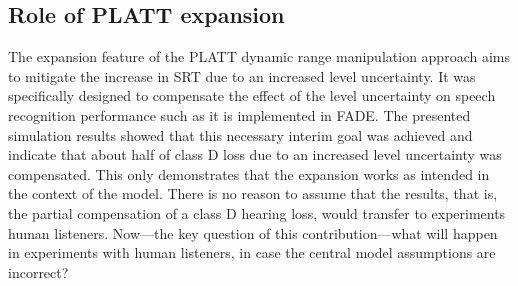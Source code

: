 \documentclass[10pt,a4paper,twocolumn]{article}
\begin{document}
\subsection*{Role of PLATT expansion}
%
The expansion feature of the PLATT dynamic range manipulation approach aims to mitigate the increase in SRT due to an increased level uncertainty.
%
It was specifically designed to compensate the effect of the level uncertainty on speech recognition performance such as it is implemented in FADE.
%
The presented simulation results showed that this necessary interim goal was achieved and indicate that about half of class D loss due to an increased level uncertainty was compensated.
%
This only demonstrates that the expansion works as intended in the context of the model.
%
There is no reason to assume that the results, that is, the partial compensation of a class D hearing loss, would transfer to experiments human listeners.
%
Now---the key question of this contribution---what will happen in experiments with human listeners, in case the central model assumptions are incorrect?
\end{document}
